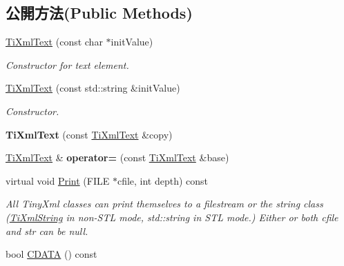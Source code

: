 \subsection*{公開方法(Public Methods)}
\begin{DoxyCompactItemize}
\item 
\hyperlink{class_ti_xml_text_af659e77c6b87d684827f35a8f4895960}{Ti\+Xml\+Text} (const char $\ast$init\+Value)
\begin{DoxyCompactList}\small\item\em Constructor for text element. \end{DoxyCompactList}\item 
\hyperlink{class_ti_xml_text_a439792f6183a3d3fb6f2bc2b16fa5691}{Ti\+Xml\+Text} (const std\+::string \&init\+Value)\hypertarget{class_ti_xml_text_a439792f6183a3d3fb6f2bc2b16fa5691}{}\label{class_ti_xml_text_a439792f6183a3d3fb6f2bc2b16fa5691}

\begin{DoxyCompactList}\small\item\em Constructor. \end{DoxyCompactList}\item 
{\bfseries Ti\+Xml\+Text} (const \hyperlink{class_ti_xml_text}{Ti\+Xml\+Text} \&copy)\hypertarget{class_ti_xml_text_a8d2cc1b4af2208cbb0171cf20f6815d1}{}\label{class_ti_xml_text_a8d2cc1b4af2208cbb0171cf20f6815d1}

\item 
\hyperlink{class_ti_xml_text}{Ti\+Xml\+Text} \& {\bfseries operator=} (const \hyperlink{class_ti_xml_text}{Ti\+Xml\+Text} \&base)\hypertarget{class_ti_xml_text_aed5b13f9c1b804c616fd533882c29f57}{}\label{class_ti_xml_text_aed5b13f9c1b804c616fd533882c29f57}

\item 
virtual void \hyperlink{class_ti_xml_text_ae74d56c5b3ddec6cc3103dd51821af92}{Print} (F\+I\+LE $\ast$cfile, int depth) const 
\begin{DoxyCompactList}\small\item\em All Tiny\+Xml classes can print themselves to a filestream or the string class (\hyperlink{class_ti_xml_string}{Ti\+Xml\+String} in non-\/\+S\+TL mode, std\+::string in S\+TL mode.) Either or both cfile and str can be null. \end{DoxyCompactList}\item 
bool \hyperlink{class_ti_xml_text_ad1a6a6b83fa2271022dd97c072a2b586}{C\+D\+A\+TA} () const \hypertarget{class_ti_xml_text_ad1a6a6b83fa2271022dd97c072a2b586}{}\label{class_ti_xml_text_ad1a6a6b83fa2271022dd97c072a2b586}


\end{DoxyCompactItemize}
